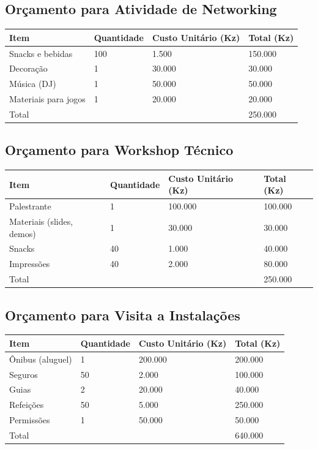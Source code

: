 \documentclass[12pt]{article}
\begin{document}
\subsection{Orçamento para Atividade de Networking}
\begin{longtable}{|l|l|l|l|}
\hline
Item & Quantidade & Custo Unitário (Kz) & Total (Kz) \\
\hline
Snacks e bebidas & 100 & 1.500 & 150.000 \\
Decoração & 1 & 30.000 & 30.000 \\
Música (DJ) & 1 & 50.000 & 50.000 \\
Materiais para jogos & 1 & 20.000 & 20.000 \\
\hline
Total & & & 250.000 \\
\hline
\end{longtable}

\subsection{Orçamento para Workshop Técnico}
\begin{longtable}{|l|l|l|l|}
\hline
Item & Quantidade & Custo Unitário (Kz) & Total (Kz) \\
\hline
Palestrante & 1 & 100.000 & 100.000 \\
Materiais (slides, demos) & 1 & 30.000 & 30.000 \\
Snacks & 40 & 1.000 & 40.000 \\
Impressões & 40 & 2.000 & 80.000 \\
\hline
Total & & & 250.000 \\
\hline
\end{longtable}

\subsection{Orçamento para Visita a Instalações}
\begin{longtable}{|l|l|l|l|}
\hline
Item & Quantidade & Custo Unitário (Kz) & Total (Kz) \\
\hline
Ônibus (aluguel) & 1 & 200.000 & 200.000 \\
Seguros & 50 & 2.000 & 100.000 \\
Guias & 2 & 20.000 & 40.000 \\
Refeições & 50 & 5.000 & 250.000 \\
Permissões & 1 & 50.000 & 50.000 \\
\hline
Total & & & 640.000 \\
\hline
\end{longtable}
\end{document}
